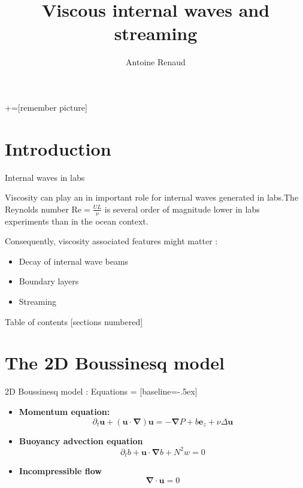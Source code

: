 \documentclass[10pt]{beamer}
\title{Viscous internal waves and streaming}
\subtitle{}
\date{}
\author{Antoine Renaud}
\institute{Laboratoire de Physique, ENS Lyon}
\begin{document}
+=[remember picture]
\everymath{\displaystyle}

\maketitle

\section{Introduction}

\begin{frame}[fragile]{Internal waves in labs}

  Viscosity can play an in important role for internal waves generated in labs.The Reynolds number $\mathrm{Re}=\frac{UL}{\nu}$  is several order of magnitude lower  in labs experiments than in the ocean context. 

  Consequently, viscosity associated features might matter :
  \begin{itemize}
    \item Decay of internal wave beams
    \item Boundary layers
    \item Streaming
  \end{itemize}
\end{frame}

\begin{frame}{Table of contents}
  [sections numbered]
  \tableofcontents[hideallsubsections]
\end{frame}
\section{The 2D Boussinesq model}

\begin{frame}[fragile]{2D Boussinesq model : Equations}
   = [baseline=-.5ex]
  \begin{itemize}
    \item \textbf{Momentum equation:}
      \begin{equation*}
        \partial_{t}\mathbf{u}+\left(\mathbf{u}\cdot\boldsymbol{\nabla}\right)\mathbf{u} = -\boldsymbol{\nabla}P+b\mathbf{e}_{z}+\nu\Delta\mathbf{u}  
      \end{equation*}
    \item \textbf{Buoyancy advection equation}
      \begin{equation*}
        \partial_{t}b+\mathbf{u}\cdot\boldsymbol{\nabla}b+N^{2}w =0 
      \end{equation*}
    \item \textbf{Incompressible flow} 
      \begin{equation*}
        \boldsymbol{\nabla}\cdot\mathbf{u} =0
      \end{equation*}
  \end{itemize}
\end{frame}
\end{document}
